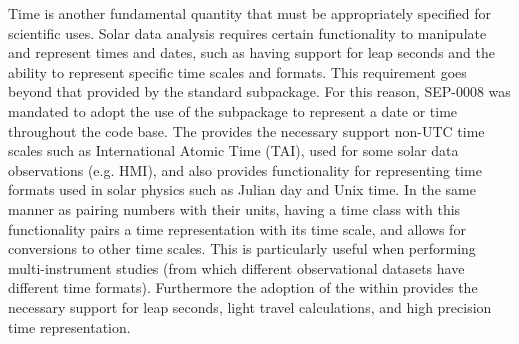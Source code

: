 Time is another fundamental quantity that must be appropriately specified for scientific uses.
Solar data analysis requires certain functionality to manipulate and represent times and dates, such as having support for leap seconds and the ability to represent specific time scales and formats. 
This requirement goes beyond that provided by the standard \python {} subpackage.
For this reason, SEP-0008 \citep{sep-0008} was mandated to adopt the use of the  subpackage to represent a date or time throughout the \sunpypkg code base.
The  provides the necessary support non-UTC time scales such as International Atomic Time (TAI), used for some solar data observations (e.g. HMI), and also provides functionality for representing time formats used in solar physics such as Julian day and Unix time. 
In the same manner as pairing numbers with their units, having a time class with this functionality pairs a time representation with its time scale, and allows for conversions to other time scales. 
This is particularly useful when performing multi-instrument studies (from which different observational datasets have different time formats). 
Furthermore the adoption of the  within \sunpypkg provides the necessary support for leap seconds, light travel calculations, and high precision time representation. 



